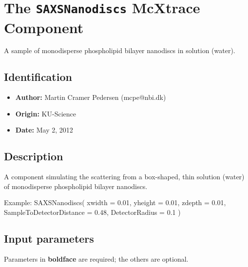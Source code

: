 \section{The \texttt{SAXSNanodiscs} McXtrace Component}
A sample of monodisperse phospholipid bilayer nanodiscs in solution (water).

\subsection*{Identification}
\begin{itemize}
  \item \textbf{Author:} Martin Cramer Pedersen (mcpe@nbi.dk)
  \item \textbf{Origin:} KU-Science
  \item \textbf{Date:} May 2, 2012
\end{itemize}

\subsection*{Description}
A component simulating the scattering from a box-shaped, thin solution (water) of monodisperse phospholipid bilayer nanodiscs.

Example: SAXSNanodiscs( xwidth = 0.01, yheight = 0.01, zdepth = 0.01, SampleToDetectorDistance = 0.48, DetectorRadius = 0.1 )

\subsection*{Input parameters}
Parameters in \textbf{boldface} are required; the others are optional.

